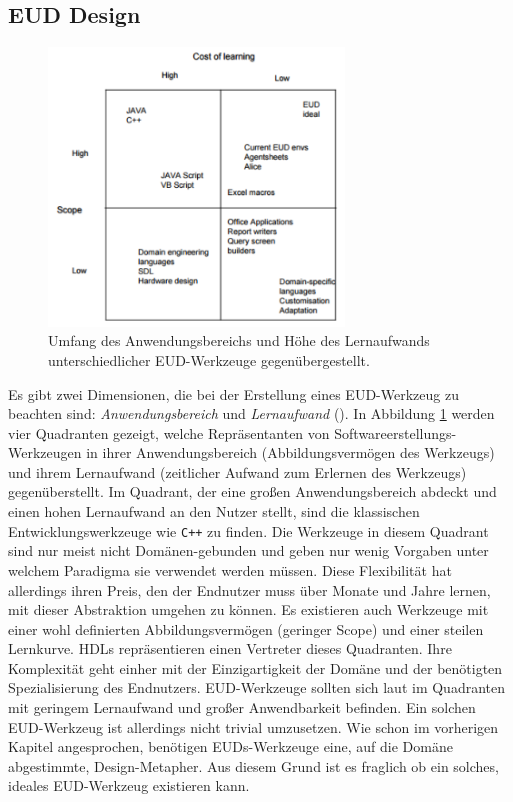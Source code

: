 \subsection{EUD Design}\label{sec:loesungsans}
\begin{figure}[H]
    \centering
    \includegraphics[width=0.7\textwidth]{bilder/chapter2/eudmatrix.png}
    \caption{Umfang des Anwendungsbereichs und Höhe des Lernaufwands unterschiedlicher \ac{EUD}-Werkzeuge gegenübergestellt.}
    \label{fig:kompvslern}
\end{figure}
Es gibt zwei Dimensionen, die bei der Erstellung eines \ac{EUD}-Werkzeug zu beachten sind: \textit{Anwendungsbereich} und \textit{Lernaufwand} (\cite{fischer2004meta}). In Abbildung \ref{fig:kompvslern} werden vier Quadranten gezeigt, welche Repräsentanten von Softwareerstellungs-Werkzeugen in ihrer Anwendungsbereich (Abbildungsvermögen des Werkzeugs) und ihrem Lernaufwand (zeitlicher Aufwand zum Erlernen des Werkzeugs) gegenüberstellt. Im Quadrant, der eine großen Anwendungsbereich abdeckt und einen hohen Lernaufwand an den Nutzer stellt, sind die klassischen Entwicklungswerkzeuge wie \texttt{C++} zu finden. Die Werkzeuge in diesem Quadrant sind nur meist nicht Domänen-gebunden und geben nur wenig Vorgaben unter welchem Paradigma sie verwendet werden müssen. Diese Flexibilität hat allerdings ihren Preis, den der Endnutzer muss über Monate und Jahre lernen, mit dieser Abstraktion umgehen zu können. Es existieren auch Werkzeuge mit einer wohl definierten Abbildungsvermögen (geringer Scope) und einer steilen Lernkurve. \acp{HDL} repräsentieren einen Vertreter dieses Quadranten. Ihre Komplexität geht einher mit der Einzigartigkeit der Domäne und der benötigten Spezialisierung des Endnutzers. \ac{EUD}-Werkzeuge sollten sich laut \cite{fischer2004meta} im Quadranten mit geringem Lernaufwand und großer Anwendbarkeit befinden. Ein solchen \ac{EUD}-Werkzeug ist allerdings nicht trivial umzusetzen. Wie schon im vorherigen Kapitel angesprochen, benötigen \acp{EUD}-Werkzeuge eine, auf die Domäne abgestimmte, Design-Metapher. Aus diesem Grund ist es fraglich ob ein solches, ideales \ac{EUD}-Werkzeug existieren kann.

